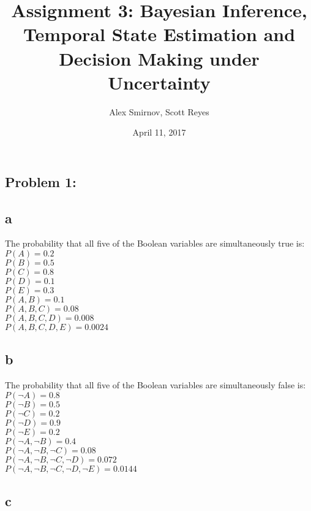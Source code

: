 \documentclass[11pt, oneside]{article}   	%
\title{Assignment 3: Bayesian Inference, Temporal State Estimation and Decision Making under Uncertainty}
\author{Alex Smirnov, Scott Reyes}
\date{April 11, 2017}							%
\begin{document}
\maketitle
\begin{flushleft}

\section*{Problem 1:}
\subsection*{a}
The probability that all five of the Boolean variables are simultaneously true is:\\
$P(A)=0.2$\\
$P(B)=0.5$\\
$P(C)=0.8$\\
$P(D)=0.1$\\
$P(E)=0.3$\\ 
$P(A, B)=0.1$\\
$P(A, B, C)=0.08$\\
$P(A, B, C, D)=0.008$\\
$P(A, B, C, D, E)=0.0024$\\
\subsection*{b}
The probability that all five of the Boolean variables are simultaneously false is:\\
$P(\neg A)=0.8$\\
$P(\neg B)=0.5$\\
$P(\neg C)=0.2$\\
$P(\neg D)=0.9$\\
$P(\neg E)=0.2$\\
$P(\neg A, \neg B)=0.4$\\
$P(\neg A, \neg B, \neg C)=0.08$\\
$P(\neg A, \neg B, \neg C, \neg D)=0.072$\\
$P(\neg A, \neg B, \neg C, \neg D, \neg E)=0.0144$\\
\subsection*{c}


\end{flushleft}
\end{document}
